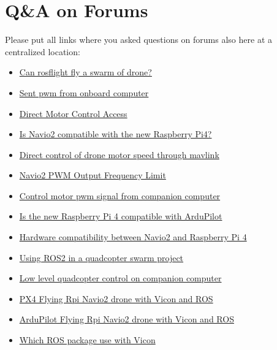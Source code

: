 \chapter{Q\&A on Forums}
    Please put all links where you asked questions on forums also here at a centralized location:
    \begin{itemize}
        \item \href{https://github.com/rosflight/rosflight/issues/100}{Can rosflight fly a swarm of drone?}
        \item \href{https://github.com/rosflight/rosflight/issues/98}{Sent pwm from onboard computer}
        \item \href{https://github.com/PX4/Firmware/pull/10863}{Direct Motor Control Access}
        \item \href{https://github.com/emlid/Navio2/issues/42}{Is Navio2 compatible with the new Raspberry Pi4?}
        \item \href{https://github.com/ArduPilot/ardupilot/issues/11859}{Direct control of drone motor speed through mavlink}
        \item \href{https://community.emlid.com/t/navio2-pwm-output-frequency-limit/1934}{Navio2 PWM Output Frequency Limit}
        \item \href{https://discuss.ardupilot.org/t/control-motor-pwm-signal-from-companion-computer/44634}{Control motor pwm signal from companion computer}
        \item \href{https://discuss.ardupilot.org/t/is-the-new-raspberry-pi-4-compatible-with-ardupilot/44956}{Is the new Raspberry Pi 4 compatible with ArduPilot}
        \item \href{https://community.emlid.com/t/hardware-compatibility-between-navio2-and-raspberry-pi-4/15344}{Hardware compatibility between Navio2 and Raspberry Pi 4}
        \item \href{https://discuss.px4.io/t/using-ros2-in-a-quadcopter-swarm-project/12055}{Using ROS2 in a quadcopter swarm project}
        \item \href{https://discuss.px4.io/t/low-level-quadcopter-control-on-companion-computer/12081}{Low level quadcopter control on companion computer}
        \item \href{https://discuss.px4.io/t/flying-rpi-navio2-drone-with-vicon-and-ros/12265}{PX4 Flying Rpi Navio2 drone with Vicon and ROS}
        \item \href{https://discuss.ardupilot.org/t/flying-rpi-navio2-drone-with-vicon-and-ros/45557}{ArduPilot Flying Rpi Navio2 drone with Vicon and ROS}
        \item \href{https://answers.ros.org/question/329849/which-ros-package-use-with-vicon/}{Which ROS package use with Vicon}
    \end{itemize}